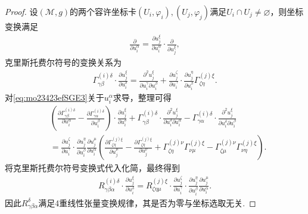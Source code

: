 \documentclass[../../main.tex]{subfiles}%
\begin{document}
\begin{proof}

设$(\mathscr{M},g)$的两个容许坐标卡$(U_i,\varphi_i),(U_j,\varphi_j)$满足$U_i\cap U_j\neq\varnothing $，则坐标变换满足
\begin{align}
\frac{\partial}{\partial u_i^\alpha}=\frac{\partial u_j^\xi}{\partial u_i^\alpha}\cdot\frac{\partial}{\partial u_j^\xi},
\label{eq:mo23423efSGE2}
\end{align}
克里斯托费尔符号的变换关系为
\begin{align}
\Gamma^{(i)\delta}_{\gamma\beta}\cdot\frac{\partial u_j^\xi}{\partial u_i^\delta}=\frac{\partial^2 u_j^\xi}{\partial u_i^\gamma\partial u_i^\beta}+\frac{\partial u_j^\zeta}{\partial u_i^\gamma}\cdot\frac{\partial u_j^\eta}{\partial u_i^\beta}\Gamma^{(j)\xi}_{\zeta\eta}.
\label{eq:mo23423efSGE3}
\end{align}
对\eqref{eq:mo23423efSGE3}关于$u_i^\alpha$求导，整理可得
\begin{align}
&\left( \frac{\partial \Gamma _{\gamma \beta}^{(i)\delta}}{\partial u_{i}^{\alpha}}-\frac{\partial \Gamma _{\gamma \alpha}^{(i)\delta}}{\partial u_{i}^{\beta}} \right) \cdot \frac{\partial u_{j}^{\xi}}{\partial u_{i}^{\delta}}+\Gamma _{\gamma \beta}^{(i)\delta}\cdot \frac{\partial ^2u_{j}^{\xi}}{\partial u_{i}^{\delta}\partial u_{i}^{\alpha}}-\Gamma _{\gamma \alpha}^{(i)\delta}\cdot \frac{\partial ^2u_{j}^{\xi}}{\partial u_{i}^{\delta}\partial u_{i}^{\beta}}
\nonumber \\
&=\frac{\partial u_{j}^{\zeta}}{\partial u_{i}^{\gamma}}\cdot \frac{\partial u_{j}^{\eta}}{\partial u_{i}^{\beta}}\frac{\partial u_{j}^{\mu}}{\partial u_{i}^{\alpha}}\left( \frac{\partial \Gamma _{\zeta \eta}^{(j)\xi}}{\partial u_{j}^{\mu}}-\frac{\partial \Gamma _{\zeta \eta}^{(j)\xi}}{\partial u_{j}^{\nu}}+\Gamma _{\zeta \eta}^{(j)\nu}\Gamma _{\nu \mu}^{(j)\xi}-\Gamma _{\zeta \mu}^{(j)\nu}\Gamma _{\nu \eta}^{(j)\xi} \right) .
\label{eq:mo23423efSGE4}
\end{align}
将克里斯托费尔符号变换式代入化简，最终得到
\begin{align}
R^{(i)\delta}_{\gamma\beta\alpha}\cdot\frac{\partial u_j^\xi}{\partial u_i^\delta}=R^{(j)\xi}_{\zeta\eta\mu}\cdot\frac{\partial u_j^\zeta}{\partial u_i^\gamma}\cdot\frac{\partial u_j^\eta}{\partial u_i^\beta}\frac{\partial u_j^\mu}{\partial u_i^\alpha}.
\label{eq:mo23423efSGE5}
\end{align}
因此$R^\delta_{\gamma\beta\alpha}$满足4重线性张量变换规律，其是否为零与坐标选取无关.

\end{proof}
\end{document}
